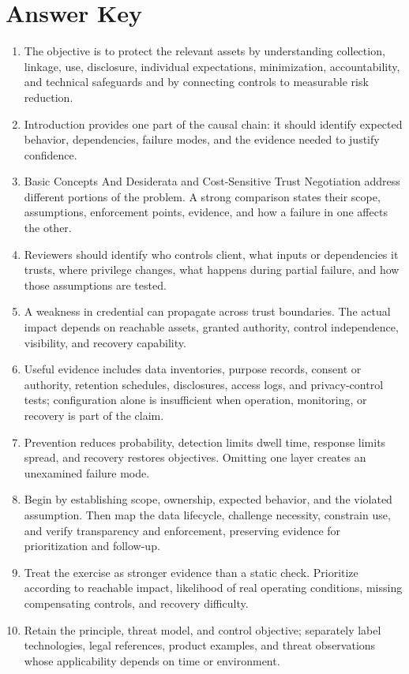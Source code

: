 \documentclass[11pt]{article}
\begin{document}
\section*{Answer Key}
\begin{enumerate}
\item The objective is to protect the relevant assets by understanding collection, linkage, use, disclosure, individual expectations, minimization, accountability, and technical safeguards and by connecting controls to measurable risk reduction.
\item Introduction provides one part of the causal chain: it should identify expected behavior, dependencies, failure modes, and the evidence needed to justify confidence.
\item Basic Concepts And Desiderata and Cost-Sensitive Trust Negotiation address different portions of the problem. A strong comparison states their scope, assumptions, enforcement points, evidence, and how a failure in one affects the other.
\item Reviewers should identify who controls client, what inputs or dependencies it trusts, where privilege changes, what happens during partial failure, and how those assumptions are tested.
\item A weakness in credential can propagate across trust boundaries. The actual impact depends on reachable assets, granted authority, control independence, visibility, and recovery capability.
\item Useful evidence includes data inventories, purpose records, consent or authority, retention schedules, disclosures, access logs, and privacy-control tests; configuration alone is insufficient when operation, monitoring, or recovery is part of the claim.
\item Prevention reduces probability, detection limits dwell time, response limits spread, and recovery restores objectives. Omitting one layer creates an unexamined failure mode.
\item Begin by establishing scope, ownership, expected behavior, and the violated assumption. Then map the data lifecycle, challenge necessity, constrain use, and verify transparency and enforcement, preserving evidence for prioritization and follow-up.
\item Treat the exercise as stronger evidence than a static check. Prioritize according to reachable impact, likelihood of real operating conditions, missing compensating controls, and recovery difficulty.
\item Retain the principle, threat model, and control objective; separately label technologies, legal references, product examples, and threat observations whose applicability depends on time or environment.
\end{enumerate}
\end{document}
